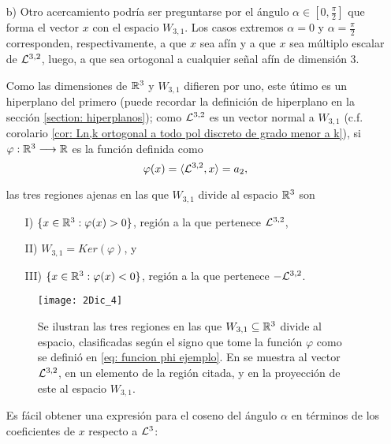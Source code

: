 \begin{ej}
\begin{itemize}
\item[b)] Otro acercamiento podría ser preguntarse por
el ángulo $\alpha \in [0, \frac{\pi}{2}]$ 
que forma el vector $x$ con el espacio 
$W_{3,1}$. Los casos extremos $\alpha=0$ y $\alpha= \frac{\pi}{2}$
corresponden, respectivamente, a que $x$ sea afín y
a que $x$ sea múltiplo escalar de $\mathcal{L}^{3,2}$, luego,
a que sea ortogonal a cualquier señal afín de dimensión 3.

Como las dimensiones de $\mathbb{R}^{3}$ y $W_{3,1}$ 
difieren por uno,
este útimo es un hiperplano
del primero (puede recordar la definición
de hiperplano en la sección
\ref{section: hiperplanos}); como $\mathcal{L}^{3,2}$
es un vector normal a $W_{3,1}$
(c.f. corolario \ref{cor: Ln,k ortogonal a todo pol discreto de grado menor a k}), 
si $\varphi: \mathbb{R}^{3} \longrightarrow \mathbb{R}$ es la función
definida como
\begin{equation}
\label{eq: funcion phi ejemplo}
\varphi(x)= \langle \mathcal{L}^{3,2} , x \rangle =a_{2},
\end{equation}



las tres regiones ajenas en las
que $W_{3,1}$ divide al espacio
$\mathbb{R}^{3}$ son 


\begin{itemize}
\item[I)] $\{ x \in \mathbb{R}^{3} : \varphi(x)>0 \}$,
región a la que pertenece $\mathcal{L}^{3,2}$,
\item[II)] $W_{3,1}= Ker(\varphi)$, y 
\item[III)] $\{ x \in \mathbb{R}^{3} : \varphi(x)<0 \}$,
región a la que pertenece $-\mathcal{L}^{3,2}$.
\end{itemize}



\begin{figure}[H]
\centering\captionsetup{format = hang}
	\begin{measuredfigure}
		\texttt{[image: 2Dic\_4]} 
		\caption{Se ilustran las tres 
		regiones en las que $W_{3,1} \subseteq \mathbb{R}^{3}$ divide al espacio,
		clasificadas según el signo que tome 
		la función $\varphi$ como se definió en
		\eqref{eq: funcion phi ejemplo}. En
		{\color{ameDorado}{dorado}} se muestra al vector
		$\mathcal{L}^{3,2}$, en {\color{ameRosa}{rosa}}
		un elemento de la región citada, y en 
		{\color{ameMorado}{morado}} la proyección de este
		al espacio $W_{3,1}$.
		}
 	\end{measuredfigure}
 \end{figure}

Es fácil obtener una expresión para el coseno del ángulo
$\alpha$ en términos de los coeficientes de $x$ respecto a $\mathcal{L}^{3}$:


\end{itemize}
\end{ej}
